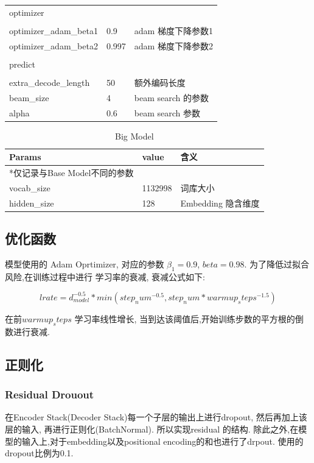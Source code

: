 \documentclass[UTF8,a4paper,10pt]{ctexart}
\begin{document}
\begin{table}[!h]
\begin{tabularx}{18cm}{lXl}
    \\
    optimizer \\ \\ 
    optimizer\_adam_beta1 & 0.9 & adam 梯度下降参数1 \\
    optimizer\_adam_beta2 & 0.997 & adam 梯度下降参数2 \\ 

    \\
    predict \\ \\
    extra\_decode\_length & 50 & 额外编码长度 \\ 
    beam\_size & 4 & beam search 的参数 \\
    alpha & 0.6 & beam search 参数 \\
    \hline

    \end{tabularx} 
  \end{table}  
  
  \begin{table}[!h]
    \caption{Big Model}
      \begin{tabularx}{18cm}{lXl}
      \hline
      Params & value  & 含义 \\
      \hline
      *仅记录与Base Model不同的参数 \\
      \hline
        vocab\_size  & 1132998 & 词库大小 \\
        hidden\_size  & 128 & Embedding 隐含维度 \\
      \hline
    \end{tabularx}
  \end{table}
  

  
\subsection{优化函数}
  模型使用的 Adam Oprtimizer, 对应的参数 $\beta_1 = 0.9$, $beta = 0.98$. 为了降低过拟合风险,在训练过程中进行
  学习率的衰减, 衰减公式如下:

  $$
    lrate = d_{model} ^{-0.5} * min(step_num^{-0.5}, step_num * warmup_steps ^{-1.5})
  $$

  在前$warmup_steps$ 学习率线性增长, 当到达该阈值后,开始训练步数的平方根的倒数进行衰减.

\subsection{正则化}

\subsubsection{Residual Drouout}
在Encoder Stack(Decoder Stack)每一个子层的输出上进行dropout, 然后再加上该层的输入, 再进行正则化(BatchNormal).
所以实现residual 的结构.
除此之外,在模型的输入上,对于embedding以及positional encoding的和也进行了drpout. 使用的dropout比例为0.1.
\end{document}
